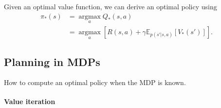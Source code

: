 \documentclass[../main.tex]{subfiles}
\begin{document}
Given an optimal value function, we can derive an optimal policy using
\[
\begin{aligned}
\pi_{*}(s) &= \mathop{\arg\max}\limits_{a}Q_{*}(s,a) \\
&= \mathop{\arg\max}\limits_{a} \left[ R(s,a)  + \gamma \mathbb{E}_{p(s'|s,a)}\left[ V_{*}(s') \right] \right] .
\end{aligned}
\]

\subsection{Planning in MDPs}

How to compute an optimal policy when the MDP is known.


\paragraph{Value iteration}
\end{document}
